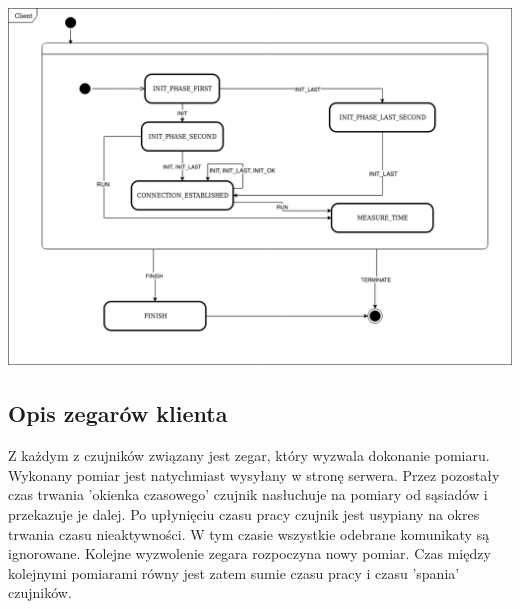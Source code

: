 \documentclass[a4paper,11pt]{article}
\begin{document}
\begin{center}
	\centerline{\includegraphics[width=1.2\textwidth]{client_states}}
\end{center}

\subsection{Opis zegarów klienta}
Z każdym z czujników związany jest zegar, który wyzwala dokonanie pomiaru. Wykonany pomiar jest natychmiast wysyłany w stronę serwera. Przez pozostały czas trwania 'okienka czasowego' czujnik nasłuchuje na pomiary od sąsiadów i przekazuje je dalej. Po upłynięciu czasu pracy czujnik jest usypiany na okres trwania czasu nieaktywności. W tym czasie wszystkie odebrane komunikaty są ignorowane. Kolejne wyzwolenie zegara rozpoczyna nowy pomiar. Czas między kolejnymi pomiarami równy jest zatem sumie czasu pracy i czasu 'spania' czujników.
 
\end{document}
